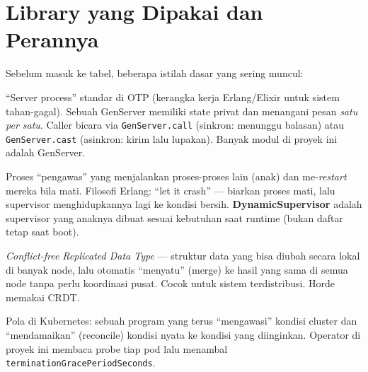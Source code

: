 \documentclass[11pt]{article}
\newcommand{\code}[1]{\texttt{\small #1}}
\newcommand{\istilah}[1]{\textbf{#1}}
\begin{document}
\section{Library yang Dipakai dan Perannya}
\label{sec:library}

Sebelum masuk ke tabel, beberapa istilah dasar yang sering muncul:

\begin{description}[leftmargin=1.4em,style=nextline]
  \item[GenServer] ``Server process'' standar di OTP (kerangka kerja Erlang/Elixir untuk sistem
  tahan-gagal). Sebuah GenServer memiliki state privat dan menangani pesan \emph{satu per satu}.
  Caller bicara via \code{GenServer.call} (sinkron: menunggu balasan) atau \code{GenServer.cast}
  (asinkron: kirim lalu lupakan). Banyak modul di proyek ini adalah GenServer.
  \item[Supervisor] Proses ``pengawas'' yang menjalankan proses-proses lain (anak) dan
  me-\emph{restart} mereka bila mati. Filosofi Erlang: ``let it crash'' --- biarkan proses mati, lalu
  supervisor menghidupkannya lagi ke kondisi bersih. \istilah{DynamicSupervisor} adalah supervisor
  yang anaknya dibuat sesuai kebutuhan saat runtime (bukan daftar tetap saat boot).
  \item[CRDT] \emph{Conflict-free Replicated Data Type} --- struktur data yang bisa diubah secara
  lokal di banyak node, lalu otomatis ``menyatu'' (merge) ke hasil yang sama di semua node tanpa perlu
  koordinasi pusat. Cocok untuk sistem terdistribusi. Horde memakai CRDT.
  \item[Operator] Pola di Kubernetes: sebuah program yang terus ``mengawasi'' kondisi cluster dan
  ``mendamaikan'' (reconcile) kondisi nyata ke kondisi yang diinginkan. Operator di proyek ini membaca
  probe tiap pod lalu menambal \code{terminationGracePeriodSeconds}.
\end{description}
\end{document}
